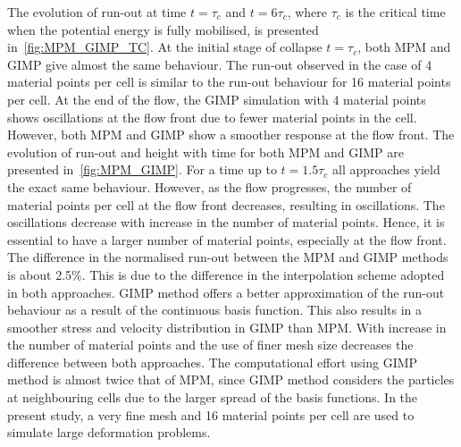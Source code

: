 The evolution of run-out at time $t=\tau_c$ and $t=6\tau_c$, where $\tau_c$ is 
the critical time when the potential energy is fully mobilised, is presented 
in~\cref{fig:MPM_GIMP_TC}. At the initial stage of collapse $t=\tau_c$, both 
MPM and GIMP give almost the same behaviour. The run-out observed in the case 
of 4 material points per cell is similar to the run-out behaviour for 16 
material points per cell. At the end of the flow, the GIMP simulation with 4 
material points shows oscillations at the flow front due to fewer material 
points in the cell. However, both MPM and GIMP show a smoother response at 
the flow front. The evolution of run-out and height with time for both MPM and 
GIMP are presented in~\cref{fig:MPM_GIMP}. For a time up to $t=1.5\tau_c$ all 
approaches yield the exact same behaviour. However, as the flow progresses, the 
number of material points per cell at the flow front decreases, resulting in 
oscillations. The oscillations decrease with increase in the number of 
material points. Hence, it is 
essential to have a larger number of material points, especially at the flow 
front. The difference in the normalised run-out between the MPM and GIMP 
methods is 
about 2.5\%. This is due to the difference in the interpolation scheme adopted 
in both approaches. GIMP method offers a better approximation of the run-out 
behaviour as a result of the continuous basis function. This also results in a 
smoother stress and velocity distribution in GIMP than MPM. With increase in 
the number of material points and the use of finer mesh size decreases the 
difference between both approaches. The computational effort using GIMP method 
is almost twice that of MPM, since GIMP method considers the particles at 
neighbouring cells due to the larger spread of the basis functions. In the 
present study, a very fine mesh and 16 material points per cell are used to 
simulate large deformation problems. 

